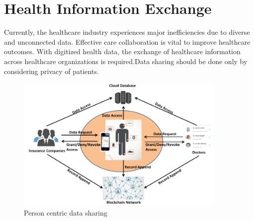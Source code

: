 \documentclass[12pt]{report}
\begin{document}
\section{Health Information Exchange}
Currently, the healthcare industry experiences major inefficiencies due to diverse and unconnected data. Effective care collaboration is vital to improve healthcare outcomes. With digitized health data, the exchange of healthcare information across healthcare organizations is required.Data sharing should be done only by considering privacy of patients.
\begin{figure}[H]
\centering
\includegraphics[width=0.9\textwidth]{centric.png}
\caption{Person centric data sharing\cite{13}}
\label{centric}
\end{figure}
\end{document}
